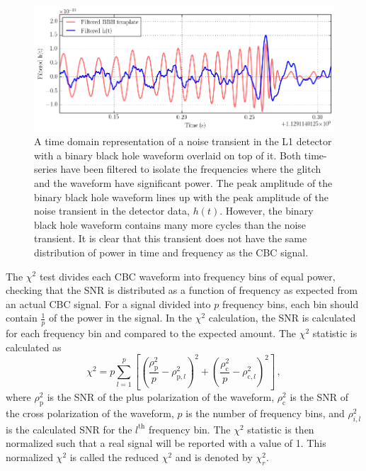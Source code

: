 \begin{figure}[ht!]
\includegraphics[width=\textwidth]{figures/introduction/bbh-with-blip}
\caption[Transient with BBH waveform]{A time domain representation of a noise transient in the %
         L1 detector with a binary black hole waveform overlaid on top of it. Both %
         time-series have been filtered to isolate the frequencies where the glitch %
         and the waveform have significant power. The peak amplitude of the binary %
         black hole waveform lines up with the peak amplitude of the noise transient %
         in the detector data, $h(t)$. However, the binary black hole waveform contains %
         many more cycles than the noise transient. It is clear that this transient does %
         not have the same distribution of power in time and frequency as the CBC signal.}
\label{fig:bbh-with-blip}
\end{figure}

The $\chi^{2}$ test divides each CBC waveform into
frequency bins of equal power, checking that the SNR is distributed as a 
function of frequency
as expected from an actual CBC signal.
For a signal divided into $p$ frequency bins, each bin should contain $\frac{1}{p}$ of the power in the 
signal. 
In the $\chi^2$ calculation, the SNR is calculated for each frequency bin and compared to the expected 
amount. The $\chi^2$ statistic is calculated as \cite{Usman:2015kfa}
\begin{equation}
\chi^2 = p\displaystyle\sum_{l=1}^{p}\left[\left(\frac{\rho_\mathrm{p}^2}{p}-\rho_{\mathrm{p},l}^2\right)^2 + \left(\frac{\rho^2_\mathrm{c}}{p}-\rho_{\mathrm{c},l}^2\right)^2 \right] \, ,
\label{eq:chisqr}
\end{equation}
where $\rho^2_\mathrm{p}$ is the SNR of the plus polarization of the waveform, $\rho^2_\mathrm{c}$ 
is the SNR of the cross 
polarization of the waveform, $p$ is the number of frequency bins, and 
$\rho^2_{i,l}$ is the calculated SNR for the $l^\mathrm{th}$ frequency bin.
The $\chi^2$ statistic is then normalized such that a real signal will be reported with a value of 1. 
This normalized $\chi^2$ is called the reduced $\chi^2$ and is denoted by $\chi^2_r$.

